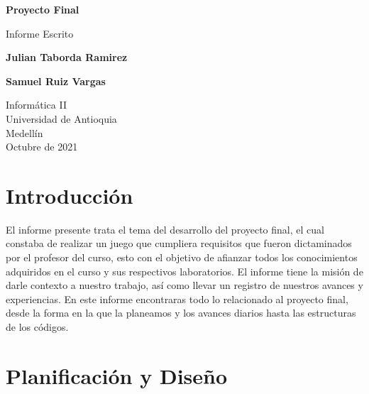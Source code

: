 \documentclass{article}
\begin{document}
\begin{titlepage}
    \begin{center}
        \vspace*{1cm}
            
        \Huge
        \textbf{Proyecto Final}
            
        \vspace{0.5cm}
        \LARGE
        Informe Escrito
            
        \vspace{1.5cm}
            
        \textbf{Julian Taborda Ramirez}
        
        \vspace{0.5cm}
        
        \textbf{Samuel Ruiz Vargas}
            
        \vfill
            
        \vspace{0.8cm}
            
        \Large
        Informática II\\
        Universidad de Antioquia\\
        Medellín\\
        Octubre de 2021
            
    \end{center}
\end{titlepage}

\begin{multicols}{2}
\tableofcontents
\end{multicols}

\newpage

\section{Introducción}
    El informe presente trata el tema del desarrollo del proyecto final, el cual constaba de realizar un juego que cumpliera requisitos que fueron dictaminados por el profesor del curso, esto con el objetivo de afianzar todos los conocimientos adquiridos en el curso y sus respectivos laboratorios. El informe tiene la misión de darle contexto a nuestro trabajo, así como llevar un registro de nuestros avances y experiencias. En este informe encontraras todo lo relacionado al proyecto final, desde la forma en la que la planeamos y los avances diarios hasta las estructuras de los códigos.
    
\section{Planificación y Diseño}
\end{document}
